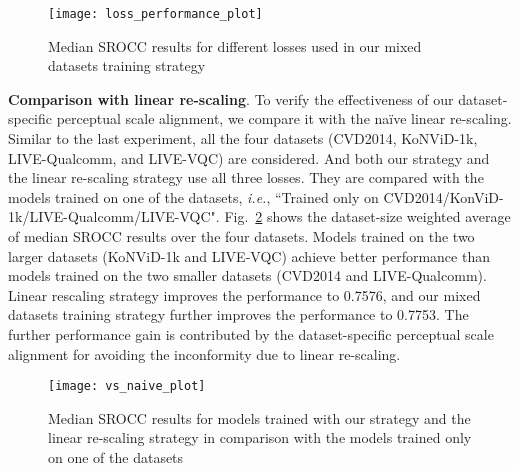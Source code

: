 \documentclass[twocolumn]{svjour3}          \smartqed  \usepackage{graphicx}
\begin{document}
\begin{figure}[!thb]
    \centering
    \texttt{[image: loss\_performance\_plot]}
    \caption{Median SROCC results for different losses used in our mixed datasets training strategy}
    \label{fig:losses}
\end{figure}

\textbf{Comparison with linear re-scaling}.
To verify the effectiveness of our dataset-specific perceptual scale alignment, we compare it with the na\"ive linear re-scaling.
Similar to the last experiment, all the four datasets (CVD2014, KoNViD-1k, LIVE-Qualcomm, and LIVE-VQC) are considered. 
And both our strategy and the linear re-scaling strategy use all three losses.
They are compared with the models trained on one of the datasets, \textit{i.e.}, ``Trained only on CVD2014/KonViD-1k/LIVE-Qualcomm/LIVE-VQC".
Fig.~\ref{fig:vs naive} shows the dataset-size weighted average of median SROCC results over the four datasets. 
Models trained on the two larger datasets (KoNViD-1k and LIVE-VQC) achieve better performance than models trained on the two smaller datasets (CVD2014 and LIVE-Qualcomm).
Linear rescaling strategy improves the performance to 0.7576, and our mixed datasets training strategy further improves the performance to 0.7753.
The further performance gain is contributed by the dataset-specific perceptual scale alignment for avoiding the inconformity due to linear re-scaling.

\begin{figure}[!thb]
    \centering
    \texttt{[image: vs\_naive\_plot]}
    \caption{Median SROCC results for models trained with our strategy and the linear re-scaling strategy in comparison with the models trained only on one of the datasets}
    \label{fig:vs naive}
\end{figure}

\begin{table}[!thb]
    \centering
    \caption{The test performance of a model trained only on a single train set}
    \label{tab:corr}

    \begin{small}
    
    \end{small}
\end{table}
\end{document}
